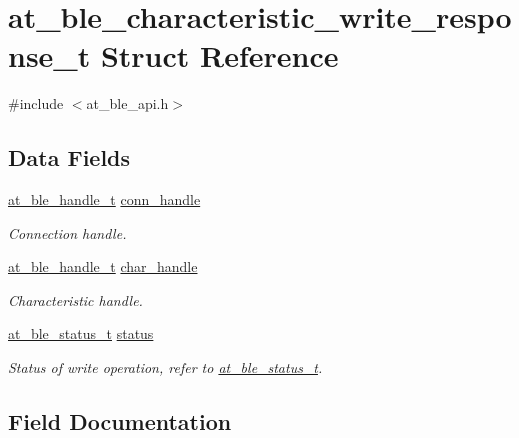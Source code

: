 \hypertarget{structat__ble__characteristic__write__response__t}{}\section{at\+\_\+ble\+\_\+characteristic\+\_\+write\+\_\+response\+\_\+t Struct Reference}
\label{structat__ble__characteristic__write__response__t}


{\ttfamily \#include $<$at\+\_\+ble\+\_\+api.\+h$>$}

\subsection*{Data Fields}
\begin{DoxyCompactItemize}
\item 
\mbox{\hyperlink{at__ble__api_8h_abd23646d0c662860741f787efc8456f2}{at\+\_\+ble\+\_\+handle\+\_\+t}} \mbox{\hyperlink{structat__ble__characteristic__write__response__t_ae42df6fd8493f8f8faeccfdd6062e96f}{conn\+\_\+handle}}
\begin{DoxyCompactList}\small\item\em Connection handle. \end{DoxyCompactList}\item 
\mbox{\hyperlink{at__ble__api_8h_abd23646d0c662860741f787efc8456f2}{at\+\_\+ble\+\_\+handle\+\_\+t}} \mbox{\hyperlink{structat__ble__characteristic__write__response__t_abf2dd98b1df5d9471f3e18780eb5e5a7}{char\+\_\+handle}}
\begin{DoxyCompactList}\small\item\em Characteristic handle. \end{DoxyCompactList}\item 
\mbox{\hyperlink{group__error__codes__group_ga3b1db9b95feb157b3c188ca27fe76988}{at\+\_\+ble\+\_\+status\+\_\+t}} \mbox{\hyperlink{structat__ble__characteristic__write__response__t_a0b48093fc2030779fc47e5216f8019e2}{status}}
\begin{DoxyCompactList}\small\item\em Status of write operation, refer to \mbox{\hyperlink{at__ble__api_8h_ace24eb4e5ca3f325c663b809da5feb92}{at\+\_\+ble\+\_\+status\+\_\+t}}. \end{DoxyCompactList}\end{DoxyCompactItemize}


\subsection{Field Documentation}
\mbox{\label{structat__ble__characteristic__write__response__t_abf2dd98b1df5d9471f3e18780eb5e5a7}} 
